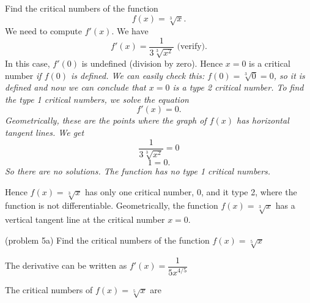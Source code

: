 \documentclass{ximera}
\begin{document}
\begin{example}[example 5] Find the critical numbers of the function 
\[f(x) = \sqrt[3] x.\]
We need to compute $f'(x)$.  We have
\[f'(x) = \frac{1}{3\sqrt[3]{x^2}} \text{   (verify)}.\]
In this case, $f'(0)$ is undefined (division by zero). Hence $x=0$ is a critical number \it{if}
$f(0)$ is defined.  We can easily check this: $f(0) = \sqrt[3] 0 = 0$, so it is defined and now we can conclude 
that $x=0$ is a type 2 critical number.
To find the type 1 critical numbers, we solve the equation
\[f'(x) = 0.\]
Geometrically, these are the points where the graph of $f(x)$ has horizontal tangent lines.
We get
\[ \frac{1}{3\sqrt[3]{x^2}} =0\]
\[ 1 =0.\]
So there are no solutions.  The function has no type 1 critical numbers.


Hence $f(x) = \sqrt[3] x$ has only one critical number, 0, and it type 2, 
where the function is not differentiable. 
Geometrically, the function $f(x) = \sqrt[3] x$ has a vertical tangent line at the critical number $x = 0$.


\begin{image}
\end{image}

\end{example}

\begin{problem}(problem 5a)
  Find the critical numbers of the function $f(x) = \sqrt[5] x$
  
    \begin{hint}
      The derivative can be written as $f'(x) = \dfrac{1}{5x^{4/5}}$
    \end{hint}
		
    
    
		The critical numbers of $f(x) = \sqrt[5] x$ are
		 \begin{multipleChoice}
		\end{multipleChoice} 
\end{problem}
\end{document}
